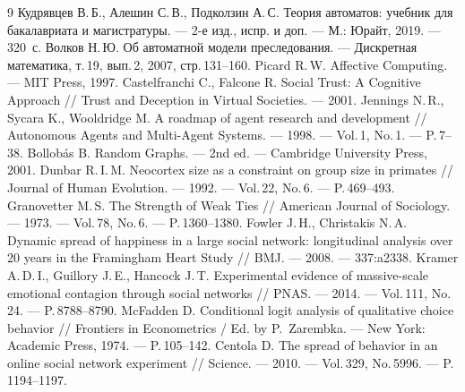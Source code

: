 \documentclass[12pt]{article}
\begin{document}
\begin{thebibliography}{9}
     Кудрявцев В.\,Б., Алешин С.\,В., Подколзин А.\,С. Теория автоматов: учебник для бакалавриата и магистратуры. --- 2-е изд., испр. и доп. --- М.: Юрайт, 2019. --- 320~с.
     Волков Н.\,Ю. Об автоматной модели преследования. --- Дискретная математика, т.\,19, вып.\,2, 2007, стр.\,131--160.
     Picard R.\,W. Affective Computing. --- MIT Press, 1997.
     Castelfranchi C., Falcone R. Social Trust: A Cognitive Approach // Trust and Deception in Virtual Societies. --- 2001.
     Jennings N.\,R., Sycara K., Wooldridge M. A roadmap of agent research and development // Autonomous Agents and Multi-Agent Systems. --- 1998. --- Vol.\,1, No.\,1. --- P.\,7--38.
     Bollobás B. Random Graphs. --- 2nd ed. --- Cambridge University Press, 2001.
     Dunbar R.\,I.\,M. Neocortex size as a constraint on group size in primates // Journal of Human Evolution. --- 1992. --- Vol.\,22, No.\,6. --- P.\,469--493.
     Granovetter M.\,S. The Strength of Weak Ties // American Journal of Sociology. --- 1973. --- Vol.\,78, No.\,6. --- P.\,1360--1380.
     Fowler J.\,H., Christakis N.\,A. Dynamic spread of happiness in a large social network: longitudinal analysis over 20 years in the Framingham Heart Study // BMJ. --- 2008. --- 337:a2338.
     Kramer A.\,D.\,I., Guillory J.\,E., Hancock J.\,T. Experimental evidence of massive-scale emotional contagion through social networks // PNAS. --- 2014. --- Vol.\,111, No.\,24. --- P.\,8788--8790.
     McFadden D. Conditional logit analysis of qualitative choice behavior // Frontiers in Econometrics / Ed. by P.~Zarembka. --- New York: Academic Press, 1974. --- P.\,105--142.
     Centola D. The spread of behavior in an online social network experiment // Science. --- 2010. --- Vol.\,329, No.\,5996. --- P.\,1194--1197.
\end{thebibliography}
\end{document}
